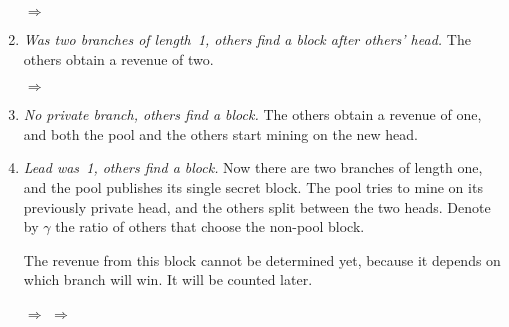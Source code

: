 \documentclass[letterpaper]{llncs}
\begin{document}
\begin{enumerate}[label=(\alph*)]
\centerline{
    {\Large \hspace{0.0cm} $\Longrightarrow$ \hspace{0.0cm}}
}

\vspace{0.5\baselineskip}

\item \emph{Was two branches of length~1, others find a block after others' head.} 
The others obtain a revenue of two. \label{itm:othersOthersZeroPrime}

\vspace{0.5\baselineskip}

\centerline{
    {\Large \hspace{0.0cm} $\Longrightarrow$ \hspace{0.0cm}}
}

\vspace{0.5\baselineskip}

\item \emph{No private branch, others find a block.} The others obtain a revenue of one, and both the pool and the others start mining on the new head. \label{itm:others0}

\item \emph{Lead was~1, others find a block.} Now there are two branches of length one, and the pool publishes its single secret block. The pool tries to mine on its previously private head, and the others split between the two heads. Denote by $\gamma$ the ratio of others that choose the non-pool block. 

The revenue from this block cannot be determined yet, because it depends on which branch will win. It will be counted later. \label{itm:others1}

\vspace{0.5\baselineskip}

\centerline{
    {\Large \hspace{0.0cm} $\Longrightarrow$ \hspace{0.0cm}}
    {\Large \hspace{0.0cm} $\Longrightarrow$ \hspace{0.0cm}}
}


\end{enumerate}
\end{document}
